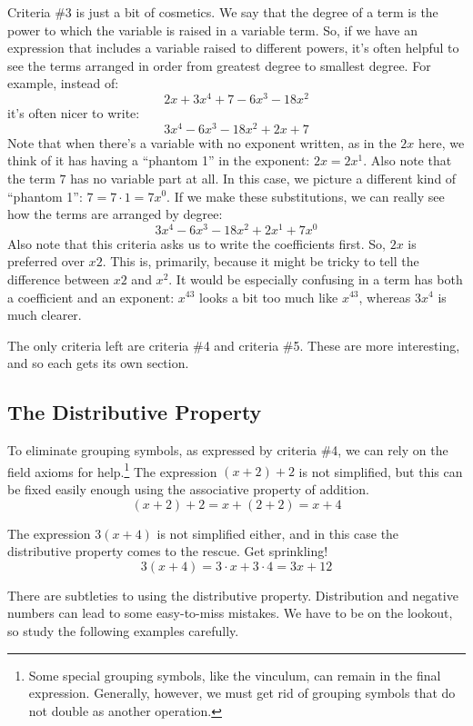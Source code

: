 Criteria \#3 is just a bit of cosmetics. We say that the \gls{degree of a term} is the power to which the variable is raised in a variable term. So, if we have an expression that includes a variable raised to different powers, it's often helpful to see the terms arranged in order from greatest degree to smallest degree. For example, instead of:
\[2x + 3x^4 + 7 - 6x^3 - 18x^2\]
it's often nicer to write:
\[3x^4 - 6x^3 - 18x^2 + 2x + 7\]
Note that when there's a variable with no exponent written, as in the $2x$ here, we think of it has having a ``phantom 1'' in the exponent: $2x = 2x^1$. Also note that the term $7$ has no variable part at all. In this case, we picture a different kind of ``phantom 1'': $7 = 7 \cdot 1 = 7x^0$. If we make these substitutions, we can really see how the terms are arranged by degree:
\[3x^4 - 6x^3 - 18x^2 + 2x^1 + 7x^0\]
Also note that this criteria asks us to write the coefficients first. So, $2x$ is preferred over $x2$. This is, primarily, because it might be tricky to tell the difference between $x2$ and $x^2$. It would be especially confusing in a term has both a coefficient and an exponent: $x^43$ looks a bit too much like $x^{43}$, whereas $3x^4$ is much clearer.

The only criteria left are criteria \#4 and criteria \#5. These are more interesting, and so each gets its own section.

\subsection{The Distributive Property}

To eliminate grouping symbols, as expressed by criteria \#4, we can rely on the field axioms for help.\footnote{Some special grouping symbols, like the vinculum, can remain in the final expression. Generally, however, we must get rid of grouping symbols that do not double as another operation.} The expression $(x + 2) + 2$ is not simplified, but this can be fixed easily enough using the associative property of addition.
\[(x+2)+2 = x+(2+2) = x+4\]

The expression $3(x + 4)$ is not simplified either, and in this case the distributive property comes to the rescue. Get sprinkling!
\[3(x+4) = 3 \cdot x + 3\cdot 4 = 3x + 12\]

There are subtleties to using the distributive property. Distribution and negative numbers can lead to some easy-to-miss mistakes. We have to be on the lookout, so study the following examples carefully.

